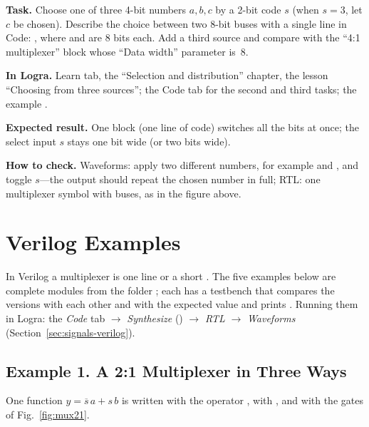 \begin{diybox}
\textbf{Task.}  Choose one of three 4-bit numbers $a,b,c$ by a 2-bit
code $s$ (when $s=3$, let $c$ be chosen).  Describe the choice between
two 8-bit buses with a single line in Code:
, where  and  are 8 bits each.
 Add a third source and compare with the ``4:1 multiplexer'' block
whose ``Data width'' parameter is~8.

\textbf{In Logra.} Learn tab, the ``Selection and distribution'' chapter, the
lesson ``Choosing from three sources''; the Code tab for the second and third
tasks; the example .

\textbf{Expected result.} One block (one line of code) switches all the bits at
once; the select input $s$ stays one bit wide (or two bits wide).

\textbf{How to check.} Waveforms: apply two different numbers, for example
 and , and toggle $s$---the output should repeat the
chosen number in full; RTL: one multiplexer symbol with buses, as in the figure
above.
\end{diybox}

\section{Verilog Examples}
\label{sec:mux-verilog}

In Verilog a multiplexer is one line or a short . The five examples
below are complete modules from the folder ; each has a
testbench  that compares the versions with each other and with the
expected value and prints . Running them in Logra: the \emph{Code} tab
$\to$ \emph{Synthesize} () $\to$ \emph{RTL} $\to$
\emph{Waveforms} (Section~\ref{sec:signals-verilog}).

\subsection{Example 1. A 2:1 Multiplexer in Three Ways}

One function $y=\overline{s}\,a+s\,b$ is written with the operator ,
with , and with the gates of Fig.~\ref{fig:mux21}.


